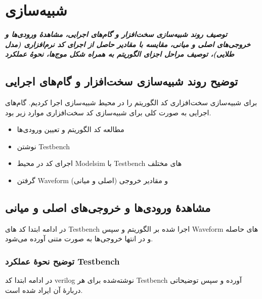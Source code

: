 \chapter{شبیه‌سازی}
\noindent
\textbf{
\textit{
توصیف روند شبیه‌سازی سخت‌افزار و گام‌های اجرایی، مشاهدهٔ ورودی‌ها و خروجی‌های اصلی و میانی، مقایسه با مقادیر حاصل از اجرای کد نرم‌افزاری (مدل طلایی)، توصیف مراحل اجزای الگوریتم به همراه شکل موج‌ها، نحوهٔ عملکرد 
}
}
\pagebreak

\section{توضیح روند شبیه‌سازی سخت‌افزار و گام‌های اجرایی}
برای شبیه‌سازی سخت‌افزاری کد 
الگوریتم 
را در محیط شبیه‌سازی 
اجرا کردیم. گام‌های اجرایی به صورت کلی برای شبیه‌سازی کد سخت‌افزاری موارد زیر بود. 
\begin{itemize}
\item
مطالعه کد الگوریتم و تعیین ورودی‌ها
\item
نوشتن Testbench
\item
اجرای کد در محیط Modelsim با Testbench های مختلف
\item
گرفتن Waveform و مقادیر خروجی (اصلی و میانی)
\end{itemize}
\section{مشاهدهٔ ورودی‌ها و خروجی‌های اصلی و میانی}
در ادامه ابتدا کد های Testbench اجرا شده بر الگوریتم و سپس Waveform
های حاصله و در انتها خروجی‌ها به صورت متنی آورده می‌شود.

\subsection{توضیح نحوهٔ عملکرد Testbench}
در ادامه ابتدا کد verilog نوشته‌شده برای هر Testbench آورده  و سپس توضیحاتی دربارهٔ آن ایراد شده است. 

 \subsubsection{}

